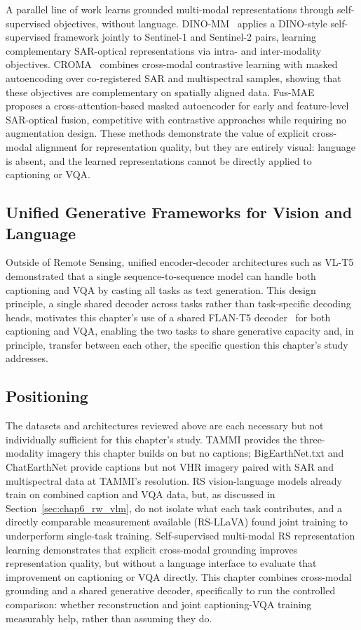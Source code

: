 A parallel line of work learns grounded multi-modal representations
through self-supervised objectives, without language.
DINO-MM~\cite{scheibenreif2022dinomm} applies a DINO-style
self-supervised framework jointly to Sentinel-1 and Sentinel-2 pairs,
learning complementary SAR-optical representations via intra- and
inter-modality objectives. CROMA~\cite{fuller2023croma} combines
cross-modal contrastive learning with masked autoencoding over
co-registered SAR and multispectral samples, showing that these
objectives are complementary on spatially aligned data.
Fus-MAE~\cite{chanthonghong2024fusmae} proposes a cross-attention-based
masked autoencoder for early and feature-level SAR-optical fusion,
competitive with contrastive approaches while requiring no augmentation
design. These methods demonstrate the value of explicit cross-modal
alignment for representation quality, but they are entirely visual:
language is absent, and the learned representations cannot be directly
applied to captioning or VQA. 

\subsection{Unified Generative Frameworks for Vision and Language}
\label{sec:chap6_rw_unified}

Outside of Remote Sensing, unified encoder-decoder architectures such as
VL-T5~\cite{cho2021vlt5} demonstrated that a single sequence-to-sequence
model can handle both captioning and VQA by casting all tasks as text
generation. This design principle, a single shared decoder across
tasks rather than task-specific decoding heads, motivates this
chapter's use of a shared FLAN-T5 decoder~\cite{chung2022flant5} for
both captioning and VQA, enabling the two tasks to share generative
capacity and, in principle, transfer between each other, the specific
question this chapter's study addresses.

\subsection{Positioning}
\label{sec:chap6_positioning}

The datasets and architectures reviewed above are each necessary but not
individually sufficient for this chapter's study. TAMMI provides the
three-modality imagery this chapter builds on but no captions;
BigEarthNet.txt and ChatEarthNet provide captions but not VHR imagery
paired with SAR and multispectral data at TAMMI's resolution. RS
vision-language models already train on combined caption and VQA data,
but, as discussed in Section~\ref{sec:chap6_rw_vlm}, do not isolate
what each task contributes, and a directly comparable measurement
available (RS-LLaVA) found joint training to underperform single-task
training. Self-supervised multi-modal RS representation learning
demonstrates that explicit cross-modal grounding improves
representation quality, but without a language interface to evaluate
that improvement on captioning or VQA directly. This chapter combines cross-modal
grounding and a shared generative decoder, specifically to run the
controlled comparison: whether reconstruction and joint captioning-VQA
training measurably help, rather than assuming they do.

